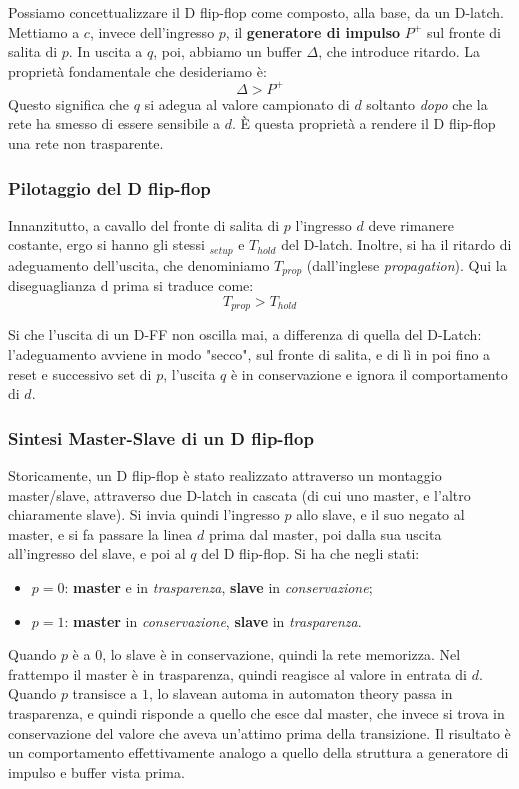 \documentclass[a4paper,11pt]{article}
\begin{document}
Possiamo concettualizzare il D flip-flop come composto, alla base, da un D-latch.
Mettiamo a $c$, invece dell'ingresso $p$, il \textbf{generatore di impulso} $P^+$ sul fronte di salita di $p$.
In uscita a $q$, poi, abbiamo un buffer $\Delta$, che introduce ritardo.
La proprietà fondamentale che desideriamo è:
$$
\Delta > P^+ 
$$
Questo significa che $q$ si adegua al valore campionato di $d$ soltanto \textit{dopo} che la rete ha smesso di essere sensibile a $d$.
È questa proprietà a rendere il D flip-flop una rete non trasparente.

\subsubsection{Pilotaggio del D flip-flop}
Innanzitutto, a cavallo del fronte di salita di $p$ l'ingresso $d$ deve rimanere costante, ergo si hanno gli stessi $_{setup}$ e $T_{hold}$ del D-latch.
Inoltre, si ha il ritardo di adeguamento dell'uscita, che denominiamo $T_{prop}$ (dall'inglese \textit{propagation}).
Qui la diseguaglianza d prima si traduce come:
$$
T_{prop} > T_{hold}
$$

\par\medskip 

Si che l'uscita di un D-FF non oscilla mai, a differenza di quella del D-Latch: l'adeguamento avviene in modo "secco", sul fronte di salita, e di lì in poi fino a reset e successivo set di $p$, l'uscita $q$ è in conservazione e ignora il comportamento di $d$.

\subsubsection{Sintesi Master-Slave di un D flip-flop}
Storicamente, un D flip-flop è stato realizzato attraverso un montaggio master/slave, attraverso due D-latch in cascata (di cui uno master, e l'altro chiaramente slave).
Si invia quindi l'ingresso $p$ allo slave, e il suo negato al master, e si fa passare la linea $d$ prima dal master, poi dalla sua uscita all'ingresso del slave, e poi al $q$ del D flip-flop.
Si ha che negli stati:
\begin{itemize}
	\item $p=0$: \textbf{master} e in \textit{trasparenza}, \textbf{slave} in \textit{conservazione};
	\item $p=1$: \textbf{master} in \textit{conservazione}, \textbf{slave} in \textit{trasparenza}.
\end{itemize}

Quando $p$ è a 0, lo slave è in conservazione, quindi la rete memorizza.
Nel frattempo il master è in trasparenza, quindi reagisce al valore in entrata di $d$.
Quando $p$ transisce a $1$, lo slavean automa in automaton theory  passa in trasparenza, e quindi risponde a quello che esce dal master, che invece si trova in conservazione del valore che aveva un'attimo prima della transizione.
Il risultato è un comportamento effettivamente analogo a quello della struttura a generatore di impulso e buffer vista prima.
\end{document}
